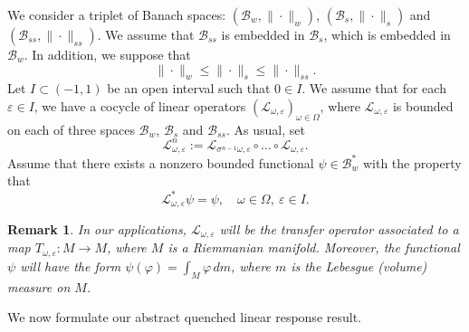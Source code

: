 \documentclass[11pt,reqno,a4paper]{article}
\theoremstyle{special}
\newtheorem{remark}[theorem]{Remark}
\renewcommand{\epsilon}{\varepsilon}
\renewcommand{\L}{\mathcal{L}}
\def\B{\mathcal{B}}
\begin{document}
We consider a triplet of Banach spaces: $(\mathcal B_w, \| \cdot \|_w)$, $(\mathcal B_s, \| \cdot \|_s)$ and $(\mathcal B_{ss}, \| \cdot \|_{ss})$. We assume that $\mathcal B_{ss}$ is embedded in $\mathcal B_s$, which is embedded in $\mathcal B_w$. In addition, we suppose that 
\[
\| \cdot \|_w \le \| \cdot \|_s \le \| \cdot \|_{ss}.
\]
Let $I\subset (-1, 1)$ be an open interval such that $0\in I$. We assume that for each $\epsilon \in I$, we have a cocycle of  linear operators $(\L_{\omega, \epsilon})_{\omega \in \Omega}$, where $\L_{\omega, \epsilon}$ is bounded on each of three spaces $\B_w$, $\B_s$ and $\B_{ss}$.  As usual, set
\[
\L_{\omega, \epsilon}^n:=\L_{\sigma^{n-1}\omega, \epsilon}\circ \ldots \circ \L_{\omega, \epsilon}.
\]
Assume that there exists a nonzero bounded functional $\psi \in \B_w^*$ with the property that 
\[
\L_{\omega, \epsilon}^*\psi=\psi, \quad \omega \in \Omega, \ \epsilon \in I.
\]
\begin{remark}\label{Rem1}
In our applications, $\L_{\omega, \epsilon}$ will be the transfer operator associated to a map  $T_{\omega, \epsilon}\colon M \to M$, where $M$ is a Riemmanian manifold. Moreover, the functional $\psi$ will have the form $\psi (\varphi)=\int_M\varphi \, dm$, where $m$ is the Lebesgue (volume) measure on $M$.
\end{remark}
We now  formulate our abstract  quenched linear response result.
\end{document}
